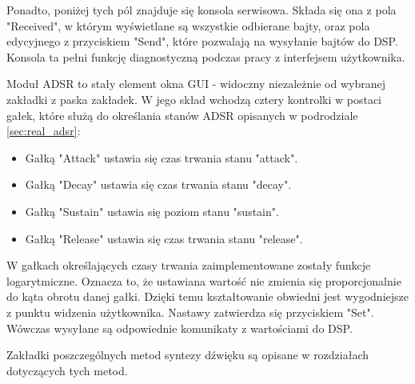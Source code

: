 Ponadto, poniżej tych pól znajduje się konsola serwisowa. Składa się ona z pola "Received", w którym wyświetlane są wszystkie odbierane bajty, oraz pola edycyjnego z przyciskiem "Send", które pozwalają na wysyłanie bajtów do DSP. Konsola ta pełni funkcję diagnostyczną podczas pracy z interfejsem użytkownika.

Moduł ADSR to stały element okna GUI - widoczny niezależnie od wybranej zakładki z paska zakładek. W jego skład wchodzą cztery kontrolki w postaci gałek, które służą do określania stanów ADSR opisanych w podrodziale \ref{sec:real_adsr}:
\begin{itemize}
	\item Gałką "Attack" ustawia się czas trwania stanu "attack".
	\item Gałką "Decay" ustawia się czas trwania stanu "decay".
	\item Gałką "Sustain" ustawia się poziom stanu "sustain".
	\item Gałką "Release" ustawia się czas trwania stanu "release".
\end{itemize}
W gałkach określających czasy trwania zaimplementowane zostały funkcje logarytmiczne. Oznacza to, że ustawiana wartość nie zmienia się proporcjonalnie do kąta obrotu danej gałki. Dzięki temu kształtowanie obwiedni jest wygodniejsze z punktu widzenia użytkownika. Nastawy zatwierdza się przyciskiem "Set". Wówczas wysyłane są odpowiednie komunikaty z wartościami do DSP.

Zakładki poszczególnych metod syntezy dźwięku są opisane w rozdziałach dotyczących tych metod.